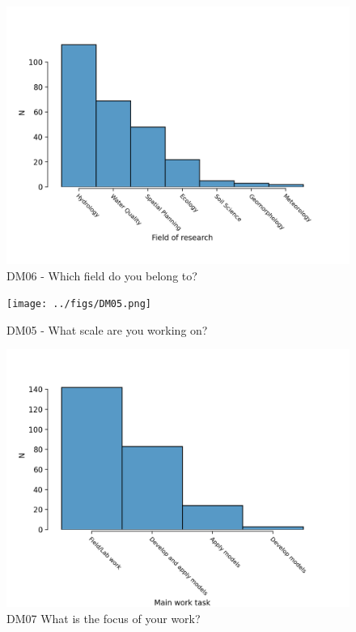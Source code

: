 \documentclass{article}
\begin{document}
\begin{figure}[!p]
    \centering
    \includegraphics[width=\textwidth]{../figs/DM06.png}
	\caption{DM06 - Which field do you belong to?}
    \label{fig:dm06}
\end{figure}

\begin{figure}[!p]
    \centering
    \texttt{[image: ../figs/DM05.png]}
	\caption{DM05 - What scale are you working on?}
    \label{fig:dm05}
\end{figure}

\begin{figure}[!p]
    \centering
    \includegraphics[width=\textwidth]{../figs/DM07.png}
	\caption{DM07 What is the focus of your work?}
    \label{fig:dm07}
\end{figure}
\end{document}
